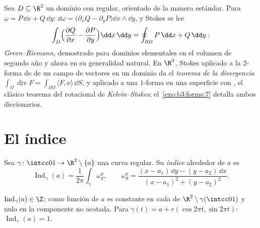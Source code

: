 \begin{example}
\label{ex:b3:forms:classical}
Sea $D \subseteq \R^2$ un dominio
 con
 regular, orientado de la manera
estándar. Para $\omega = P\,\dd x +
Q\,\dd y$: $\dd\omega = \bigl(\partial_xQ -
\partial_yP\bigr)\dd x\wedge\dd y$, y Stokes se lee
\[
\int_D\Bigl(\frac{\partial Q}{\partial x} -
\frac{\partial P}{\partial y}\Bigr)\dd x\,\dd y
= \oint_{\partial D}P\,\dd x + Q\,\dd y :
\]
\emph{Green--Riemann}, demostrado para dominios elementales en el
volumen de segundo año y ahora en su generalidad natural. En $\R^3$,
Stokes aplicado a la $2$-forma de  de un campo de vectores en un
dominio  da el \emph{teorema
de la divergencia} $\int_\Omega\operatorname{div}F =
\int_{\partial\Omega}\langle F, \nu\rangle\,\dd S$, y aplicado a una
$1$-forma en una superficie con , el clásico teorema del rotacional
de \emph{Kelvin--Stokes}; el~\cref{exo:b3:forms:7} detalla ambos
diccionarios.
\end{example}

\section{El índice}\label{sec:b3:forms:winding}

\begin{definition}\label{def:b3:forms:winding}
Sea $\gamma\colon\intcc01\to\R^2\setminus\{a\}$ una curva
 regular. Su
\emph{índice} alrededor de $a$ es
\[
\operatorname{Ind}_\gamma(a) =
\frac1{2\pi}\int_\gamma\omega_\theta^a,
\qquad
\omega_\theta^a = \frac{(x - a_1)\,\dd y - (y - a_2)\,\dd
x}{(x - a_1)^2 + (y - a_2)^2} .
\]
\end{definition}

\begin{proposition}\label{prop:b3:forms:windinginteger}
$\operatorname{Ind}_\gamma(a) \in \Z$; como función de $a$ es constante
en cada  de
$\R^2\setminus\gamma(\intcc01)$ y nulo en la componente no acotada. Para
$\gamma(t) = a + r(\cos2\pi t, \sin2\pi t)$:
$\operatorname{Ind}_\gamma(a) = 1$.
\end{proposition}

